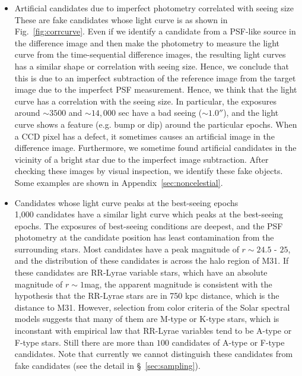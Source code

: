 \documentclass[iop, apj]{emulateapj}
\newcommand{\?}{\stackrel{?}{=}}
\begin{document}
\begin{itemize}
	
	\item Artificial candidates due to imperfect photometry correlated with seeing size\\
	These are fake candidates whose light curve is as shown in Fig.~\ref{fig:corrcurve}. Even if we identify a candidate from a PSF-like source in the difference image and then make the photometry to measure the light curve from the time-sequential difference images, the resulting light curves has a similar shape or correlation with seeing size. Hence, we conclude that this is due to an imperfect subtraction of the reference image from the target image due to the imperfect PSF measurement. Hence, we think that the light curve has a correlation with the seeing size. In particular, the exposures around $\sim3500$ and $\sim14,000$ sec have a bad seeing ($\sim1.0''$), and the light curve shows a feature (e.g. bump or dip) around the particular epochs.  When a CCD pixel has a defect, it sometimes causes an artificial image in the difference image. Furthermore, we sometime found artificial candidates in the vicinity of a bright star due to the imperfect image subtraction. 
After checking these images by visual inspection, we identify these fake objects. 
	Some examples are shown in Appendix~\ref{sec:noncelestial}. 

	\item Candidates whose light curve peaks at the best-seeing epochs\\	
	1,000 candidates have a similar light curve which peaks at the best-seeing epochs. The exposures of best-seeing conditions are deepest, and the PSF photometry at the candidate position has least contamination from the surrounding stars. 
	Most candidates have a peak magnitude of $r\sim24.5$ - $25$, and the distribution of these candidates is across the halo region of M31. 
	If these candidates are RR-Lyrae variable stars, which have an absolute magnitude of $r\sim1$mag, the apparent magnitude is consistent with the hypothesis that the RR-Lyrae stars are in 750 kpc distance, which is the distance to M31. 
	However, selection from color criteria of the Solar spectral models suggests that many of them are 
	M-type or K-type stars, which is inconstant with empirical law that RR-Lyrae variables tend to be 
	A-type or F-type stars. Still there are more than $100$ candidates of A-type or F-type candidates. 
	Note that currently we cannot distinguish these candidates from fake candidates (see the detail in \S~\ref{sec:sampling}). 

	\end{itemize}
\end{document}

